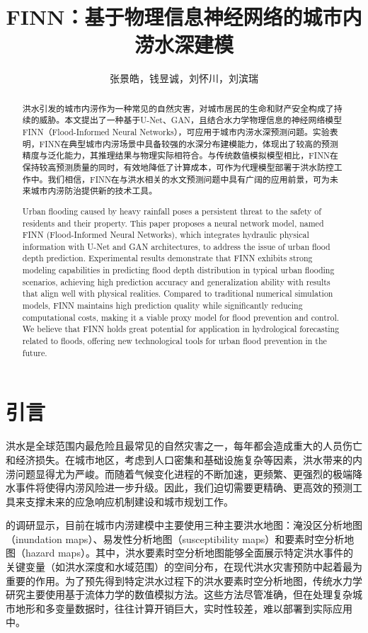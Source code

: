 \documentclass[12pt, a4paper]{article}
\title{{{\textbf{FINN：基于物理信息神经网络的城市内涝水深建模\\}}}}
\author{张景皓，钱昱诚，刘怀川，刘滨瑞}
\begin{document}
\maketitle

\begin{abstract}
洪水引发的城市内涝作为一种常见的自然灾害，对城市居民的生命和财产安全构成了持续的威胁。本文提出了一种基于U-Net、GAN，且结合水力学物理信息的神经网络模型FINN（Flood-Informed Neural Networks），可应用于城市内涝水深预测问题。实验表明，FINN在典型城市内涝场景中具备较强的水深分布建模能力，体现出了较高的预测精度与泛化能力，其推理结果与物理实际相符合。与传统数值模拟模型相比，FINN在保持较高预测质量的同时，有效地降低了计算成本，可作为代理模型部署于洪水防控工作中。我们相信，FINN在与洪水相关的水文预测问题中具有广阔的应用前景，可为未来城市内涝防治提供新的技术工具。

Urban flooding caused by heavy rainfall poses a persistent threat to the safety of residents and their property. This paper proposes a neural network model, named FINN (Flood-Informed Neural Networks), which integrates hydraulic physical information with U-Net and GAN architectures, to address the issue of urban flood depth prediction. Experimental results demonstrate that FINN exhibits strong modeling capabilities in predicting flood depth distribution in typical urban flooding scenarios, achieving high prediction accuracy and generalization ability with results that align well with physical realities. Compared to traditional numerical simulation models, FINN maintains high prediction quality while significantly reducing computational costs, making it a viable proxy model for flood prevention and control. We believe that FINN holds great potential for application in hydrological forecasting related to floods, offering new technological tools for urban flood prevention in the future.
\end{abstract}

\section{引言}

洪水是全球范围内最危险且最常见的自然灾害之一，每年都会造成重大的人员伤亡和经济损失。在城市地区，考虑到人口密集和基础设施复杂等因素，洪水带来的内涝问题显得尤为严峻。而随着气候变化进程的不断加速，更频繁、更强烈的极端降水事件将使得内涝风险进一步升级。因此，我们迫切需要更精确、更高效的预测工具来支撑未来的应急响应机制建设和城市规划工作。

\cite{bentivoglio2022deep}的调研显示，目前在城市内涝建模中主要使用三种主要洪水地图：淹没区分析地图（inundation maps）、易发性分析地图（susceptibility maps）和要素时空分析地图（hazard maps）。其中，洪水要素时空分析地图能够全面展示特定洪水事件的关键变量（如洪水深度和水域范围）的空间分布，在现代洪水灾害预防中起着最为重要的作用。为了预先得到特定洪水过程下的洪水要素时空分析地图，传统水力学研究主要使用基于流体力学的数值模拟方法。这些方法尽管准确，但在处理复杂城市地形和多变量数据时，往往计算开销巨大，实时性较差，难以部署到实际应用中。
\end{document}
